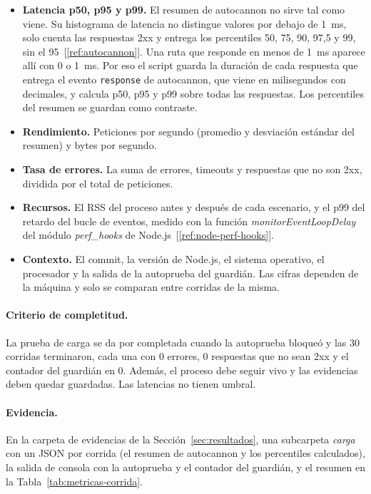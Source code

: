 \begin{itemize}
  \item \textbf{Latencia p50, p95 y p99.} El resumen de autocannon no sirve tal como viene. Su histograma de latencia no distingue valores por debajo de 1~ms, solo cuenta las respuestas 2xx y entrega los percentiles 50, 75, 90, 97,5 y 99, sin el 95~[\ref{ref:autocannon}]. Una ruta que responde en menos de 1~ms aparece allí con 0 o 1~ms. Por eso el script guarda la duración de cada respuesta que entrega el evento \texttt{response} de autocannon, que viene en milisegundos con decimales, y calcula p50, p95 y p99 sobre todas las respuestas. Los percentiles del resumen se guardan como contraste.
  \item \textbf{Rendimiento.} Peticiones por segundo (promedio y desviación estándar del resumen) y bytes por segundo.
  \item \textbf{Tasa de errores.} La suma de errores, timeouts y respuestas que no son 2xx, dividida por el total de peticiones.
  \item \textbf{Recursos.} El RSS del proceso antes y después de cada escenario, y el p99 del retardo del bucle de eventos, medido con la función \emph{monitorEventLoopDelay} del módulo \emph{perf\_hooks} de Node.js~[\ref{ref:node-perf-hooks}].
  \item \textbf{Contexto.} El commit, la versión de Node.js, el sistema operativo, el procesador y la salida de la autoprueba del guardián. Las cifras dependen de la máquina y solo se comparan entre corridas de la misma.
\end{itemize}

\paragraph{Criterio de completitud.} La prueba de carga se da por completada cuando la autoprueba bloqueó  y las 30 corridas terminaron, cada una con 0 errores, 0 respuestas que no sean 2xx y el contador del guardián en 0. Además, el proceso debe seguir vivo y las evidencias deben quedar guardadas. Las latencias no tienen umbral.

\paragraph{Evidencia.} En la carpeta de evidencias de la Sección~\ref{sec:resultados}, una subcarpeta \emph{carga} con un JSON por corrida (el resumen de autocannon y los percentiles calculados), la salida de consola con la autoprueba y el contador del guardián, y el resumen en la Tabla~\ref{tab:metricas-corrida}.

